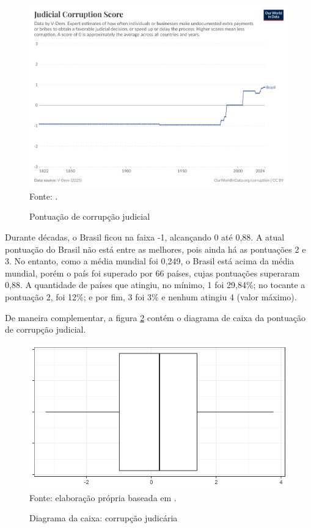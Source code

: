 \begin{figure}[H]
    \centering
    \caption{Pontuação de corrupção judicial}
    \includegraphics[width=1\linewidth]{figuras/judicial-corruption-score.png}
    \label{fig:judicial-corruption-score}
    \footnotesize{Fonte: \cite{judicial-corruption-score}.}
\end{figure}

Durante décadas, o Brasil ficou na faixa -1, alcançando 0 até 0,88. A atual pontuação do Brasil não está entre as melhores, pois ainda há as pontuações 2 e 3. No entanto, como a média mundial foi 0,249, o Brasil está acima da média mundial, porém o país foi superado por 66 países, cujas pontuações superaram 0,88. A quantidade de países que atingiu, no mínimo, 1 foi 29,84\%; no tocante a pontuação 2, foi 12\%; e por fim, 3 foi 3\% e nenhum atingiu 4 (valor máximo).

De maneira complementar, a figura \ref{fig:quartis_corrupcao_judiciaria} contém o diagrama de caixa da pontuação de corrupção judicial.

\begin{figure}[H]
    \centering
    \caption{Diagrama da caixa: corrupção judicária}
    \includegraphics[width=1\linewidth]{figuras/quartis_corrupcao_judiciaria.png}
    \label{fig:quartis_corrupcao_judiciaria}
    \footnotesize{Fonte: elaboração própria baseada em \cite{judicial-corruption-score}.}
\end{figure}

